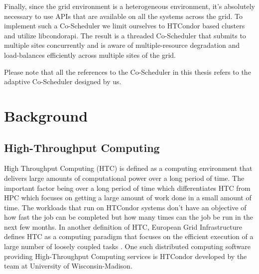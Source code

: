 \documentclass[ms,electronic,double]{nuthesis}
\begin{document}
Finally, since the grid environment is a heterogeneous environment, it's absolutely necessary
to use APIs that are available on all the systems across the grid. To implement such a Co-Scheduler
 we limit ourselves to HTCondor based clusters and utilize libcondorapi. The result is a threaded Co-Scheduler 
that submits to multiple sites concurrently and is aware of multiple-resource degradation and
load-balances efficiently across multiple sites of the grid. 

Please note that all the references to the Co-Scheduler in this thesis refers to the adaptive Co-Scheduler designed 
by us.  

\chapter{Background}

\section{High-Throughput Computing} High Throughput Computing (HTC) is defined as 
a computing environment that delivers large amounts of computational
power over a long period of time. The important factor being over a long period of time which 
differentiates HTC from HPC which focuses on getting a large amount of work done in a small amount of time.
The workloads that run on HTCondor systems don't have an objective of  how fast the job can be completed 
but how many times can the job be run in the next few months. In another definition of HTC, European Grid  
Infrastructure defines HTC as a computing paradigm that focuses on the efficient 
execution of a large number of loosely coupled tasks \cite{manual56}. One such 
distributed computing software providing High-Throughput Computing services is 
HTCondor developed by the team at University of Wisconsin-Madison.
\end{document}
